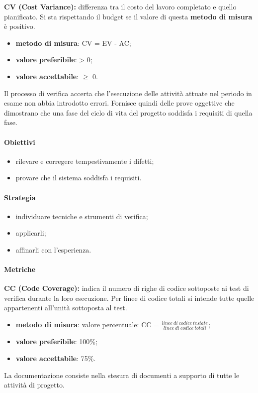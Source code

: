 \textbf{CV (Cost Variance):} differenza tra il costo del lavoro completato e quello pianificato. Si sta rispettando il budget se il valore di questa \textbf{metodo di misura} 
è positivo.
\begin{itemize}
    \item \textbf{metodo di misura}: CV = EV - AC;
    \item \textbf{valore preferibile}: > 0;
    \item \textbf{valore accettabile}: $\geq$ 0.
\end{itemize}
Il processo di verifica accerta che l'esecuzione delle attività attuate nel periodo in esame non abbia introdotto errori.
Fornisce quindi delle prove oggettive che dimostrano che una fase del ciclo di vita del progetto soddisfa i requisiti di quella fase.
\paragraph{Obiettivi}
\begin{itemize}
    \item rilevare e corregere tempestivamente i difetti;
    \item provare che il sistema soddisfa i requisiti.
\end{itemize}
\paragraph{Strategia}
\begin{itemize}
    \item individuare tecniche e strumenti di verifica;
    \item applicarli;
    \item affinarli con l'esperienza.
\end{itemize}
\paragraph{Metriche}
\textbf{CC (Code Coverage):} indica il numero di righe di codice sottoposte ai test di verifica durante la loro esecuzione. Per linee di codice totali 
si intende tutte quelle appartenenti all'unità sottoposta al test.
\begin{itemize}
    \item \textbf{metodo di misura}: valore percentuale: CC = $\frac{linee \ di \ codice \ testate}{linee \ di \ codice \ totali}$;
    \item \textbf{valore preferibile}: 100\%;
    \item \textbf{valore accettabile}: 75\%.
\end{itemize}
La documentazione consiste nella stesura di documenti a supporto di tutte le attività di progetto.
